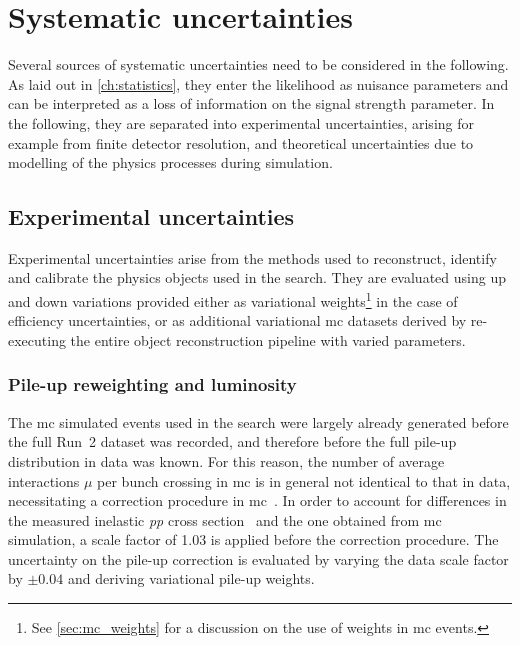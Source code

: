 

\chapter{Systematic uncertainties}\label{ch:uncertainties}

\graphicspath{{chapter-uncertainties/Figs/Vector/}{chapter-uncertainties/Figs/}}

Several sources of systematic uncertainties need to be considered in the following. As laid out in \cref{ch:statistics}, they enter the likelihood as nuisance parameters and can be interpreted as a loss of information on the signal strength parameter. In the following, they are separated into experimental uncertainties, arising for example from finite detector resolution, and theoretical uncertainties due to modelling of the physics processes during simulation. 

\section{Experimental uncertainties}

Experimental uncertainties arise from the methods used to reconstruct, identify and calibrate the physics objects used in the \onelepton search.
They are evaluated using up and down variations provided either as variational weights\footnote{See \cref{sec:mc_weights} for a discussion on the use of weights in \gls{mc} events.} in the case of efficiency uncertainties, or as additional variational \gls{mc} datasets derived by re-executing the entire object reconstruction pipeline with varied parameters.

\subsection{Pile-up reweighting and luminosity}

The \gls{mc} simulated events used in the \onelepton search were largely already generated before the full Run~2 dataset was recorded, and therefore before the full pile-up distribution in data was known.
For this reason, the number of average interactions $\mu$ per bunch crossing in \gls{mc} is in general not identical to that in data, necessitating a correction procedure in \gls{mc}~\cite{Buttinger:2014726}.
In order to account for differences in the measured inelastic \textit{pp} cross section~\cite{STDM-2015-05} and the one obtained from \gls{mc} simulation, a scale factor of 1.03 is applied before the correction procedure.
The uncertainty on the pile-up correction is evaluated by varying the data scale factor by $\pm 0.04$ and deriving variational pile-up weights.

